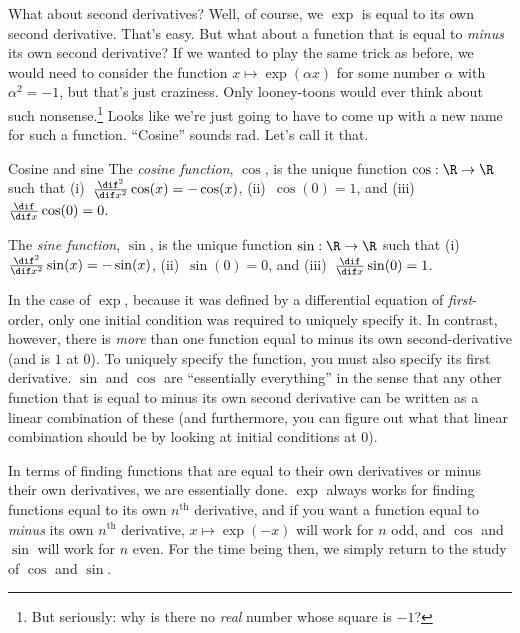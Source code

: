 What about second derivatives?  Well, of course, we $\exp$ is equal to its own second derivative.  That's easy.  But what about a function that is equal to \emph{minus} its own second derivative?  If we wanted to play the same trick as before, we would need to consider the function $x\mapsto \exp (\alpha x)$ for some number $\alpha$ with $\alpha ^2=-1$, but that's just craziness.  Only looney-toons would ever think about such nonsense.\footnote{But seriously:  why is there no \emph{real} number whose square is $-1$?}  Looks like we're just going to have to come up with a new name for such a function.  ``Cosine'' sounds rad.  Let's call it that.
\begin{dfn}{Cosine and sine}{}
The \emph{cosine function}, $\cos$\index[notation]{$\cos$}, is the unique function $\cos :\R \rightarrow \R$ such that (i)~$\frac{\dif ^2}{\dif x^2}\cos (x)=-\cos (x)$, (ii)~$\cos (0)=1$, and (iii)~$\frac{\dif}{\dif x}\cos (0)=0$.

The \emph{sine function}, $\sin$\index[notation]{$\sin$}, is the unique function $\sin :\R \rightarrow \R$ such that (i)~$\frac{\dif ^2}{\dif x^2}\sin (x)=-\sin (x)$, (ii)~$\sin (0)=0$, and (iii)~$\frac{\dif}{\dif x}\sin (0)=1$.
\begin{rmk}
In the case of $\exp$, because it was defined by a differential equation of \emph{first}-order, only one initial condition was required to uniquely specify it.  In contrast, however, there is \emph{more} than one function equal to minus its own second-derivative (and is $1$ at $0$).  To uniquely specify the function, you must also specify its first derivative.  $\sin$ and $\cos$ are ``essentially everything'' in the sense that any other function that is equal to minus its own second derivative can be written as a linear combination of these (and furthermore, you can figure out what that linear combination should be by looking at initial conditions at $0$).
\end{rmk}
\end{dfn}

In terms of finding functions that are equal to their own derivatives or minus their own derivatives, we are essentially done.  $\exp$ always works for finding functions equal to its own $n^{\text{th}}$ derivative, and if you want a function equal to \emph{minus} its own $n^{\text{th}}$ derivative, $x\mapsto \exp (-x)$ will work for $n$ odd, and $\cos$ and $\sin$ will work for $n$ even.  For the time being then, we simply return to the study of $\cos$ and $\sin$.


